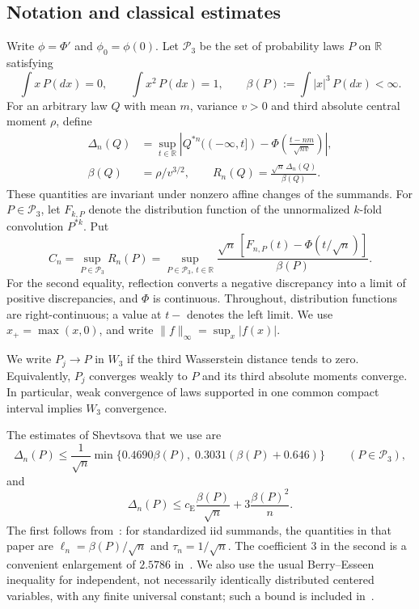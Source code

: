 \documentclass[aop]{imsart}
\theoremstyle{plain}
\theoremstyle{definition}
\theoremstyle{definition}
\newcommand{\R}{\mathbb R}
\newcommand{\Pthree}{\mathcal P_3}
\newcommand{\ce}{c_{\mathrm E}}
\begin{document}
\subsection{Notation and classical estimates}\label{subsec:notation}

Write \(\phi=\Phi'\) and \(\phi_0=\phi(0)\). Let \(\Pthree\) be the set of probability laws \(P\) on \(\R\) satisfying
\[
 \int x\,P(dx)=0,\qquad \int x^2\,P(dx)=1,
 \qquad \beta(P):=\int |x|^3\,P(dx)<\infty.
\]
For an arbitrary law \(Q\) with mean \(m\), variance \(v>0\) and third absolute central moment \(\rho\), define
\begin{equation}\label{eq:raw-normalization}
\begin{split}
 \Delta_n(Q)&=\sup_{t\in\R}
 \left|Q^{*n}(({-\infty},t])-
 \Phi\left(\frac{t-nm}{\sqrt{nv}}\right)\right|,\\
 \beta(Q)&=\rho/v^{3/2},\qquad
 R_n(Q)=\frac{\sqrt n\,\Delta_n(Q)}{\beta(Q)}.
\end{split}
\end{equation}
These quantities are invariant under nonzero affine changes of the summands. For \(P\in\Pthree\), let \(F_{k,P}\) denote the distribution function of the unnormalized \(k\)-fold convolution \(P^{*k}\). Put
\begin{equation}\label{eq:cn}
 C_n=\sup_{P\in\Pthree}R_n(P)
 =\sup_{P\in\Pthree,\,t\in\R}
 \frac{\sqrt n\,[F_{n,P}(t)-\Phi(t/\sqrt n)]}{\beta(P)}.
\end{equation}
For the second equality, reflection converts a negative discrepancy into a limit of positive discrepancies, and \(\Phi\) is continuous. Throughout, distribution functions are right-continuous; a value at \(t-\) denotes the left limit. We use \(x_+=\max(x,0)\), and write \(\|f\|_\infty=\sup_x|f(x)|\).

We write \(P_j\to P\) in \(W_3\) if the third Wasserstein distance tends to zero. Equivalently, \(P_j\) converges weakly to \(P\) and its third absolute moments converge. In particular, weak convergence of laws supported in one common compact interval implies \(W_3\) convergence.

The estimates of Shevtsova that we use are
\begin{equation}\label{eq:structural}
 \Delta_n(P)\le\frac1{\sqrt n}
 \min\{0.4690\beta(P),\;0.3031(\beta(P)+0.646)\}
 \qquad(P\in\Pthree),
\end{equation}
and
\begin{equation}\label{eq:asymptotic}
 \Delta_n(P)\le \ce\frac{\beta(P)}{\sqrt n}
                  +3\frac{\beta(P)^2}{n}.
\end{equation}
The first follows from~\cite[pp.~124--125]{Shevtsova2013}: for
standardized iid summands, the quantities in that paper are
\(\ell_n=\beta(P)/\sqrt n\) and \(\tau_n=1/\sqrt n\).
The coefficient \(3\) in the second is a convenient enlargement of
\(2.5786\) in~\cite[Corollary~4.18, p.~302]{Shevtsova2012}. We also use the usual Berry--Esseen inequality for independent, not necessarily identically distributed centered variables, with any finite universal constant; such a bound is included in~\cite{Shevtsova2013}.
\end{document}
